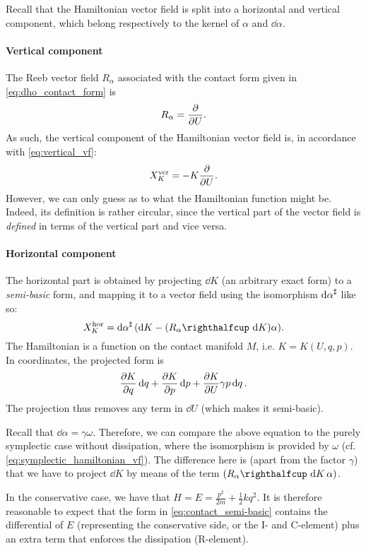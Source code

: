 Recall that the Hamiltonian vector field is split into a horizontal and vertical component, which belong respectively to the kernel of $\alpha$ and $\dd{\alpha}$.

\paragraph{Vertical component} The Reeb vector field $R_\alpha$ associated with the contact form given in \cref{eq:dho_contact_form} is 
$$ R_\alpha = \pdv{}{U}. $$
As such, the vertical component of the Hamiltonian vector field is, in accordance with \cref{eq:vertical_vf}:
\begin{equation}
    X_K^\text{ver} = -K\pdv{}{U}.
    \label{eq:dho_vertical}
\end{equation}
However, we can only guess as to what the Hamiltonian function might be. Indeed, its definition is rather circular, since the vertical part of the vector field is \emph{defined} in terms of the vertical part and vice versa.

\paragraph{Horizontal component} The horizontal part is obtained by projecting $\dd{K}$ (an arbitrary exact form) to a \emph{semi-basic} form, and mapping it to a vector field using the isomorphism $\dd{\alpha}^\sharp$ like so:
$$ X_K^\text{hor} = \fromDual{\dd{\alpha}}(\dd{K} - \qty(\intpr{R_\alpha}{\dd{K}})\alpha). $$
The Hamiltonian is a function on the contact manifold $M$, i.e. $K = K(U, q, p)$. In coordinates, the projected form is
\begin{equation}
    \pdv{K}{q}\dd{q} + \pdv{K}{p}\dd{p} + \pdv{K}{U} \gamma p \dd{q}.
    \label{eq:contact_semi-basic}
\end{equation}
The projection thus removes any term in $\dd{U}$ (which makes it semi-basic).

Recall that $\dd{\alpha} = \gamma \omega $. Therefore, we can compare the above equation to the purely symplectic case without dissipation, where the isomorphism is provided by $\omega$ (cf. \cref{eq:symplectic_hamiltonian_vf}). The difference here is (apart from the factor $\gamma$) that we have to project $\dd{K}$ by means of the term $\qty(\intpr{R_\alpha}{\dd{K}}\alpha)$.

In the conservative case, we have that $H = E = \frac{p^2}{2m} + \frac{1}{2}kq^2$. It is therefore reasonable to expect that the form in \cref{eq:contact_semi-basic} contains the differential of $E$ (representing the conservative side, or the I- and C-element) plus an extra term that enforces the dissipation (R-element). 

